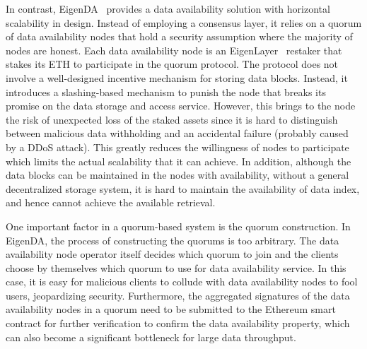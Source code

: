 In contrast, EigenDA~\cite{eigenda} provides a data availability solution with horizontal scalability in design. Instead of employing a consensus layer, it relies on a quorum of data availability nodes that hold a security assumption where the majority of nodes are honest. Each data availability node is an EigenLayer~\cite{eigenlayer} restaker that stakes its ETH to participate in the quorum protocol. The protocol does not involve a well-designed incentive mechanism for storing data blocks. Instead, it introduces a slashing-based mechanism to punish the node that breaks its promise on the data storage and access service. However, this brings to the node the risk of unexpected loss of the staked assets since it is hard to distinguish between malicious data withholding and an accidental failure (probably caused by a DDoS attack). This greatly reduces the willingness of nodes to participate which limits the actual scalability that it can achieve. 
In addition, although the data blocks can be maintained in the nodes with availability, without a general decentralized storage system, it is hard to maintain the availability of data index, and hence cannot achieve the available retrieval.

One important factor in a quorum-based system is the quorum construction. In EigenDA, the process of constructing the quorums is too arbitrary. The data availability node operator itself decides which quorum to join and the clients choose by themselves which quorum to use for data availability service. In this case, it is easy for malicious clients to collude with data availability nodes to fool users, jeopardizing security.
Furthermore, the aggregated signatures of the data availability nodes in a quorum need to be submitted to the Ethereum smart contract for further verification to confirm the data availability property, which can also become a significant bottleneck for large data throughput.  


